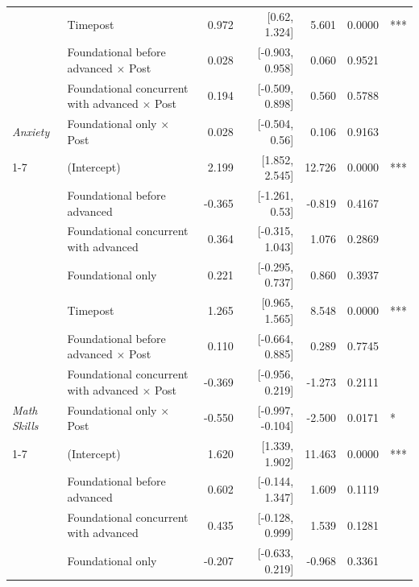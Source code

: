 \begin{table}[!h]
\begin{threeparttable}
\begin{tabular}[t]{>{}llrrrrl}
 & Timepost & 0.972 & {}[0.62, 1.324] & 5.601 & 0.0000 & ***\\

 & Foundational before advanced $\times$ Post & 0.028 & {}[-0.903, 0.958] & 0.060 & 0.9521 & \\

 & Foundational concurrent with advanced $\times$ Post & 0.194 & {}[-0.509, 0.898] & 0.560 & 0.5788 & \\

\multirow[t]{-7}{*}[\normalbaselineskip]{\raggedright\arraybackslash \em{Anxiety}} & Foundational only $\times$ Post & 0.028 & {}[-0.504, 0.56] & 0.106 & 0.9163 & \\
\cmidrule{1-7}
 & (Intercept) & 2.199 & {}[1.852, 2.545] & 12.726 & 0.0000 & ***\\

 & Foundational before advanced & -0.365 & {}[-1.261, 0.53] & -0.819 & 0.4167 & \\

 & Foundational concurrent with advanced & 0.364 & {}[-0.315, 1.043] & 1.076 & 0.2869 & \\

 & Foundational only & 0.221 & {}[-0.295, 0.737] & 0.860 & 0.3937 & \\

 & Timepost & 1.265 & {}[0.965, 1.565] & 8.548 & 0.0000 & ***\\

 & Foundational before advanced $\times$ Post & 0.110 & {}[-0.664, 0.885] & 0.289 & 0.7745 & \\

 & Foundational concurrent with advanced $\times$ Post & -0.369 & {}[-0.956, 0.219] & -1.273 & 0.2111 & \\

\multirow[t]{-7}{*}[\normalbaselineskip]{\raggedright\arraybackslash \em{Math Skills}} & Foundational only $\times$ Post & -0.550 & {}[-0.997, -0.104] & -2.500 & 0.0171 & *\\
\cmidrule{1-7}
 & (Intercept) & 1.620 & {}[1.339, 1.902] & 11.463 & 0.0000 & ***\\

 & Foundational before advanced & 0.602 & {}[-0.144, 1.347] & 1.609 & 0.1119 & \\

 & Foundational concurrent with advanced & 0.435 & {}[-0.128, 0.999] & 1.539 & 0.1281 & \\

 & Foundational only & -0.207 & {}[-0.633, 0.219] & -0.968 & 0.3361 & \\


\end{tabular}
\end{threeparttable}
\end{table}
